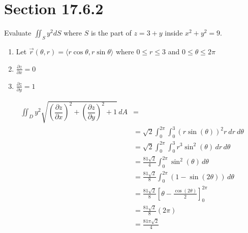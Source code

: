 \documentclass[letter,11pt]{article}
\begin{document}
\section*{Section 17.6.2}
Evaluate $\iint_{S} y^{2} d S$ where $S$ is the part of $z=3+y$ inside $x^{2}+y^{2}=9$.
\begin{enumerate}[label = \roman*.]
    \item Let $\vec{r}\left(\theta, r\right) = \langle r\cos \theta, r\sin \theta\rangle$ where $0\leq r \leq 3$ and $0 \leq \theta \leq 2\pi$
    \item $\frac{\partial z}{\partial x} = 0$
    \item $\frac{\partial z}{\partial y} = 1$
\end{enumerate}
\begin{align*}
    \iint_{D} y^2 \sqrt{\left(\dfrac{\partial z}{\partial x}\right)^2+\left(\dfrac{\partial z}{\partial y}\right)^2 +1} \, dA &=\\
    &= \sqrt{2}\int_{0}^{2\pi}\int_{0}^{3}\left(r\sin\left(\theta\right)\right)^{2}r\ dr\ d\theta \\
    &= \sqrt{2}\int_{0}^{2\pi}\int_{0}^{3}r^{3}\sin^{2}\left(\theta\right) \, dr\, d\theta \\
    &= \frac{81\sqrt{2}}{4}\int_{0}^{2\pi}\sin^{2}\left(\theta\right) \,d\theta\\
    &= \frac{81\sqrt{2}}{8}\int_{0}^{2\pi}\left(1-\sin\left(2\theta\right)\right)\, d\theta\\
    &= \frac{81\sqrt{2}}{8} \left[\theta-\frac{\cos\left(2\theta\right)}{2}\right]_{0}^{2\pi}\\
    &= \frac{81\sqrt{2}}{8} \left(2\pi\right)\\
    &= \boxed{\frac{81\pi\sqrt{2}}{4}}
\end{align*}
\end{document}
